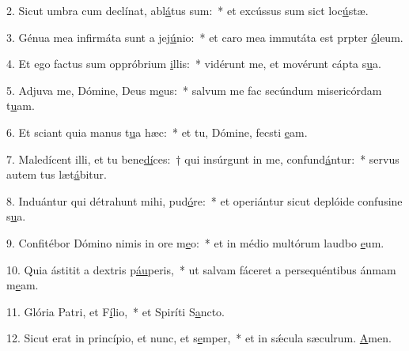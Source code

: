 2. Sicut umbra cum declínat, abl\uline{á}tus sum:~* et excússus sum sict loc\uline{ú}stæ.\par 
3. Génua mea infirmáta sunt a jej\uline{ú}nio:~* et caro mea immutáta est prpter \uline{ó}leum.\par 
4. Et ego factus sum oppróbrium \uline{i}llis:~* vidérunt me, et movérunt cápta s\uline{u}a.\par 
5. Adjuva me, Dómine, Deus m\uline{e}us:~* salvum me fac secúndum misericórdam t\uline{u}am.\par 
6. Et sciant quia manus t\uline{u}a hæc:~* et tu, Dómine, fecsti \uline{e}am.\par 
7. Maledícent illi, et tu bene\uline{dí}ces:~† qui insúrgunt in me, confund\uline{á}ntur:~* servus autem tus læt\uline{á}bitur.\par 
8. Induántur qui détrahunt mihi, pud\uline{ó}re:~* et operiántur sicut deplóide confusine s\uline{u}a.\par 
9. Confitébor Dómino nimis in ore m\uline{e}o:~* et in médio multórum laudbo \uline{e}um.\par 
10. Quia ástitit a dextris p\uline{áu}peris,~* ut salvam fáceret a persequéntibus ánmam m\uline{e}am.\par 
11. Glória Patri, et F\uline{í}lio,~* et Spiríti S\uline{a}ncto.\par 
12. Sicut erat in princípio, et nunc, et s\uline{e}mper,~* et in sǽcula sæculrum. \uline{A}men.\par 
